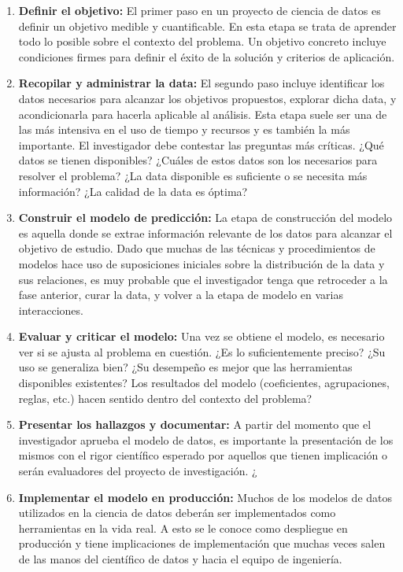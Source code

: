 \begin{spacing}{1.5}
\begin{enumerate}
	\item \textbf{Definir el objetivo:} El primer paso en un proyecto de ciencia de datos es definir un objetivo medible y cuantificable. En esta etapa se trata de aprender todo lo posible sobre el contexto del problema. Un objetivo concreto incluye condiciones firmes para definir el éxito de la solución y criterios de aplicación.  
	\item \textbf{Recopilar y administrar la data:} El segundo paso incluye identificar los datos necesarios para alcanzar los objetivos propuestos, explorar dicha data, y acondicionarla para hacerla aplicable al análisis. Esta etapa suele ser una de las más intensiva en el uso de tiempo y recursos y es también la más importante. El investigador debe contestar las preguntas más críticas. ¿Qué datos se tienen disponibles? ¿Cuáles de estos datos son los necesarios para resolver el problema? ¿La data disponible es suficiente o se necesita más información? ¿La calidad de la data es óptima?
	\item \textbf{Construir el modelo de predicción:} La etapa de construcción del modelo es aquella donde se extrae información relevante de los datos para alcanzar el objetivo de estudio. Dado que muchas de las técnicas y procedimientos de modelos hace uso de suposiciones iniciales sobre la distribución de la data y sus relaciones, es muy probable que el investigador tenga que retroceder a la fase anterior, curar la data, y volver a la etapa de modelo en varias interacciones. 
	\item \textbf{Evaluar y criticar el modelo:} Una vez se obtiene el modelo, es necesario ver si se ajusta al problema en cuestión. ¿Es lo suficientemente preciso? ¿Su uso se generaliza bien? ¿Su desempeño es mejor que las herramientas disponibles existentes? 
	Los resultados del modelo (coeficientes, agrupaciones, reglas, etc.) hacen sentido dentro del contexto del problema?    \item \textbf{Presentar los hallazgos y documentar:}
	A partir del momento que el investigador aprueba el modelo de datos, es importante la presentación de los mismos con el rigor científico esperado por aquellos que tienen implicación o serán evaluadores del proyecto de investigación.    ¿ \item \textbf{Implementar el modelo en producción:} Muchos de los modelos de datos utilizados en la ciencia de datos deberán ser implementados como herramientas en la vida real. A esto se le conoce como despliegue en producción y tiene implicaciones de implementación que muchas veces salen de las manos del científico de datos y hacia el equipo de ingeniería. 
\end{enumerate}


\end{spacing}
